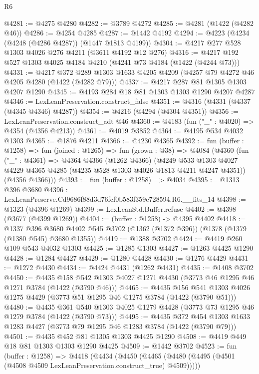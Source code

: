 \begin{lexlean}{R6}
\begin{coremodule}
@4281 := @4275 @4280
@4282 := @3789 @4272
@4285 := @4281 (@1422 (@4282 @46))
@4286 := @4254 @4285
@4287 := @1442 @4192
@4294 := @4223 (@4234 (@4248 (@4286 @4287)) (@1447 @1813 @4199))
@4304 := @4217 @277 @528 @1303 @4026 @276 @4211 (@3611 @4192 @12 @276)
@4316 := @4217 @192 @527 @1303 @4025 @4184 @4210 (@4241 @73 @4184 (@1422 (@4244 @73)))
@4331 := @4217
    @372
    @289
    @1303
    @1633
    @4205
    @4209
    (@4257 @79 @4272 @46 @4205 @4280 (@1422 (@4282 @79)))
@4337 := @4217 @287 @81 @1305 @1303 @4207 @1290
@4345 := @4193 @284 @18 @81 @1303 @1303 @1290 @4207 @4287
@4346 := LexLeanPreservation.construct_false
@4351 := @4316 (@4331 (@4337 (@4345 @4346) @4287))
@4354 := @4216 (@4294 (@4304 @4351))
@4356 := LexLeanPreservation.construct_adt @46
@4360 := @4183 (fun ("_" : @4020) => @4354 (@4356 @4213))
@4361 := @4019 @3852
@4364 := @4195 @534 @4032 @1303
@4365 := @1876 @4211
@4366 := @4230 @4365
@4392 := fun (buffer : @1258) =>
  fun (joined : @1265) =>
  fun (grown : @38) =>
  @4084
    (@4360
      (fun ("_" : @4361) =>
      @4364
        @4366
        (@1262 @4366)
        (@4249 @533 @1303 @4027 @4229 @4365 @4285 (@4235 @528 @1303 @4026 @1813 @4211 @4247 @4351))
        (@4356 @4366)))
@4393 := fun (buffer : @1258) => @4034
@4395 := @1313 @396 @3680
@4396 := LexLeanPreserve.Cd9686f88d3d76fcf0b583f359c728594.R6.__fits_14
@4398 := @1323 (@4396 @1269)
@4399 := LexLeanStd.Buffer.refuse
@4402 := @4398 (@3677 (@4399 @1269))
@4404 := (buffer : @1258) -> @4395 @4402
@4418 := @1337
    @396
    @3680
    @4402
    @545
    @3702
    (@1362 (@1372 @396))
    (@1378 (@1379 (@1380 @545) @3680 @1355))
@4419 := @1388 @3702
@4424 := @4419 @260 @109 @543 @4032 @1303
@4425 := @1285 @1303
@4427 := @1263 @4425 @1290
@4428 := @1284 @4427
@4429 := @1280 @4428
@4430 := @1276 @4429
@4431 := @1272 @4430
@4434 := @4424 @4431 (@1262 @4431)
@4435 := @1408 @3702
@4450 := @4435
    @158
    @542
    @1303
    @4027
    @1271
    @4430
    (@3773 @46 @1295 @46 @1271 @3784 (@1422 (@3790 @46)))
@4465 := @4435
    @156
    @541
    @1303
    @4026
    @1275
    @4429
    (@3773 @51 @1295 @46 @1275 @3784 (@1422 (@3790 @51)))
@4480 := @4435
    @361
    @540
    @1303
    @4025
    @1279
    @4428
    (@3773 @73 @1295 @46 @1279 @3784 (@1422 (@3790 @73)))
@4495 := @4435
    @372
    @454
    @1303
    @1633
    @1283
    @4427
    (@3773 @79 @1295 @46 @1283 @3784 (@1422 (@3790 @79)))
@4501 := @4435 @452 @81 @1305 @1303 @4425 @1290
@4508 := @4419 @449 @18 @81 @1303 @1303 @1290 @4425
@4509 := @1442 @3702
@4523 := fun (buffer : @1258) =>
  @4418
    (@4434
      (@4450 (@4465 (@4480 (@4495 (@4501 (@4508 @4509 LexLeanPreservation.construct_true) @4509)))))

\end{coremodule}
\end{lexlean}
